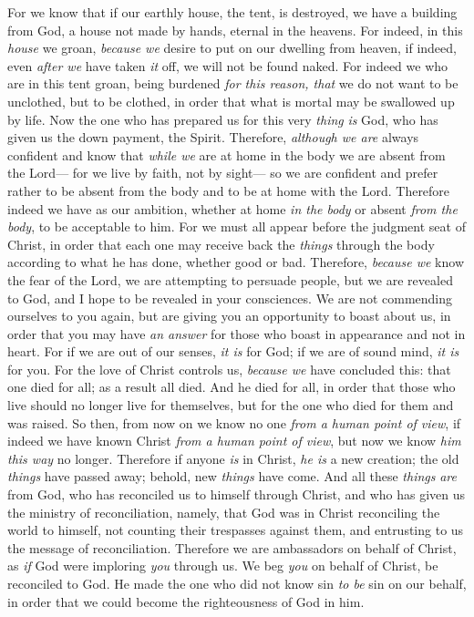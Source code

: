 \begin{biblechapter} %
 For we know that if our earthly house, the tent, is destroyed, we have a building from God, a house not made by hands, eternal in the heavens.
\verse For indeed, in this \textit{house} we groan, \textit{because we} desire to put on our dwelling from heaven,
\verse if indeed, even \textit{after we} have taken \textit{it} off, we will not be found naked.
\verse For indeed we who are in this tent groan, being burdened \textit{for this reason, that} we do not want to be unclothed, but to be clothed, in order that what is mortal may be swallowed up by life.
\verse Now the one who has prepared us for this very \textit{thing} \textit{is} God, who has given us the down payment, the Spirit.
\verse Therefore, \textit{although we are} always confident and know that \textit{while we} are at home in the body we are absent from the Lord—
\verse for we live by faith, not by sight—
\verse so we are confident and prefer rather to be absent from the body and to be at home with the Lord.
\verse Therefore indeed we have as our ambition, whether at home \textit{in the body} or absent \textit{from the body}, to be acceptable to him.
\verse For we must all appear before the judgment seat of Christ, in order that each one may receive back the \textit{things} through the body according to what he has done, whether good or bad.
 Therefore, \textit{because we} know the fear of the Lord, we are attempting to persuade people, but we are revealed to God, and I hope to be revealed in your consciences.
\verse We are not commending ourselves to you again, but are giving you an opportunity to boast about us, in order that you may have \textit{an answer} for those who boast in appearance and not in heart.
\verse For if we are out of our senses, \textit{it is} for God; if we are of sound mind, \textit{it is} for you.
\verse For the love of Christ controls us, \textit{because we} have concluded this: that one died for all; as a result all died.
\verse And he died for all, in order that those who live should no longer live for themselves, but for the one who died for them and was raised.
\verse So then, from now on we know no one \textit{from a human point of view}, if indeed we have known Christ \textit{from a human point of view}, but now we know \textit{him this way} no longer.
\verse Therefore if anyone \textit{is} in Christ, \textit{he is} a new creation; the old \textit{things} have passed away; behold, new \textit{things} have come.
\verse And all these \textit{things} \textit{are} from God, who has reconciled us to himself through Christ, and who has given us the ministry of reconciliation,
\verse namely, that God was in Christ reconciling the world to himself, not counting their trespasses against them, and entrusting to us the message of reconciliation.
\verse Therefore we are ambassadors on behalf of Christ, as \textit{if} God were imploring \textit{you} through us. We beg \textit{you} on behalf of Christ, be reconciled to God.
\verse He made the one who did not know sin \textit{to be} sin on our behalf, in order that we could become the righteousness of God in him.
\end{biblechapter}

